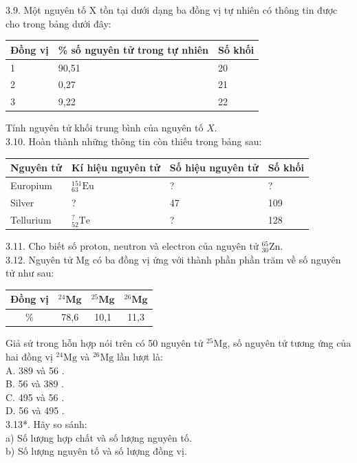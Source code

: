 \documentclass[10pt]{article}
\begin{document}
3.9. Một nguyên tố X tồn tại dưới dạng ba đồng vị tự nhiên có thông tin được cho trong bảng dưới đây:

\begin{center}
\begin{tabular}{|l|l|l|}
\hline
Đồng vị & \% số nguyên tử trong tự nhiên & Số khối \\
\hline
1 & 90,51 & 20 \\
\hline
2 & 0,27 & 21 \\
\hline
3 & 9,22 & 22 \\
\hline
\end{tabular}
\end{center}

Tính nguyên tử khối trung bình của nguyên tố $X$.\\
3.10. Hoàn thành những thông tin còn thiếu trong bảng sau:

\begin{center}
\begin{tabular}{|l|l|l|l|}
\hline
Nguyên tử & Kí hiệu nguyên tử & Số hiệu nguyên tử & Số khối \\
\hline
Europium & \( { }_{63}^{151} \mathrm{Eu} \) & ? & ? \\
\hline
Silver & ? & 47 & 109 \\
\hline
Tellurium & \( { }_{52}^{?} \mathrm{Te} \) & ? & 128 \\
\hline
\end{tabular}
\end{center}

3.11. Cho biết số proton, neutron và electron của nguyên tử ${ }_{30}^{65} \mathrm{Zn}$.\\
3.12. Nguyên tử Mg có ba đồng vị ứng với thành phần phần trăm về số nguyên tử như sau:

\begin{center}
\begin{tabular}{|c|c|c|c|}
\hline
Đồng vị & ${ }^{24} \mathbf{M g}$ & ${ }^{25} \mathbf{M g}$ & ${ }^{26} \mathbf{M g}$ \\
\hline
$\%$ & 78,6 & 10,1 & 11,3 \\
\hline
\end{tabular}
\end{center}

Giả sử trong hỗn hợp nói trên có 50 nguyên tử ${ }^{25} \mathrm{Mg}$, số nguyên tử tương ứng của hai đồng vị ${ }^{24} \mathrm{Mg}$ và ${ }^{26} \mathrm{Mg}$ lần lượt là:\\
A. 389 và 56 .\\
B. 56 và 389 .\\
C. 495 và 56 .\\
D. 56 và 495 .\\
3.13*. Hãy so sánh:\\
a) Số lượng hợp chất và số lượng nguyên tố.\\
b) Số lượng nguyên tố và số lượng đồng vị.
\end{document}
